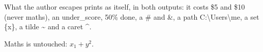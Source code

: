 What the author escapes prints as itself, in both outputs: it costs \$5 and
\$10 (never maths), an under\_score, 50\% done, a \# and \&, a path
C:\textbackslash{}Users\textbackslash{}me, a set \{x\}, a tilde \~{} and a caret \^{}. 

Maths is untouched: $x_1 + y^2$.

